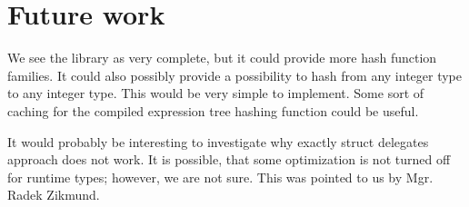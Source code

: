 \section{Future work}
We see the library as very complete, but it could provide more hash function families. It could also possibly provide a possibility to hash from any integer type to any integer type. This would be very simple to implement.
Some sort of caching for the compiled expression tree hashing function could be useful.

It would probably be interesting to investigate why exactly struct delegates approach does not work. It is possible, that some optimization is not turned off for runtime types; however, we are not sure. This was pointed to us by Mgr. Radek Zikmund.

